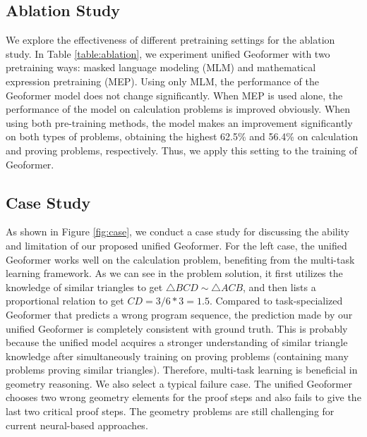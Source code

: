 \documentclass[11pt]{article}
\begin{document}
\subsection{Ablation Study}
We explore the effectiveness of different pretraining settings for the ablation study. In Table \ref{table:ablation}, we experiment unified Geoformer with two pretraining ways: masked language modeling (MLM) and mathematical expression pretraining (MEP).
Using only MLM, the performance of the Geoformer model does not change significantly.
When MEP is used alone, the performance of the model on calculation problems is improved obviously. When using both pre-training methods, the model makes an improvement significantly on both types of problems, obtaining the highest 62.5\% and 56.4\% on calculation and proving problems, respectively. Thus, we apply this setting to the training of Geoformer.



\subsection{Case Study}

As shown in Figure \ref{fig:case}, we conduct a case study for discussing the ability and limitation of our proposed unified Geoformer. 
For the left case, the unified Geoformer works well on the calculation problem, benefiting from the multi-task learning framework. As we can see in the problem solution, it first utilizes the knowledge of similar triangles to get $\triangle  BCD \sim \triangle ACB$, and then lists a proportional relation to get $CD=3/6*3=1.5$.
Compared to task-specialized Geoformer that predicts a wrong program sequence, the prediction made by our unified Geoformer is completely consistent with ground truth. This is probably because the unified model acquires a stronger understanding of similar triangle knowledge after simultaneously training on proving problems (containing many problems proving similar triangles). Therefore, multi-task learning is beneficial in geometry reasoning.
We also select a typical failure case. The unified Geoformer chooses two wrong geometry elements for the proof steps and also fails to give the last two critical proof steps. The geometry problems are still challenging for current neural-based approaches.
\end{document}

